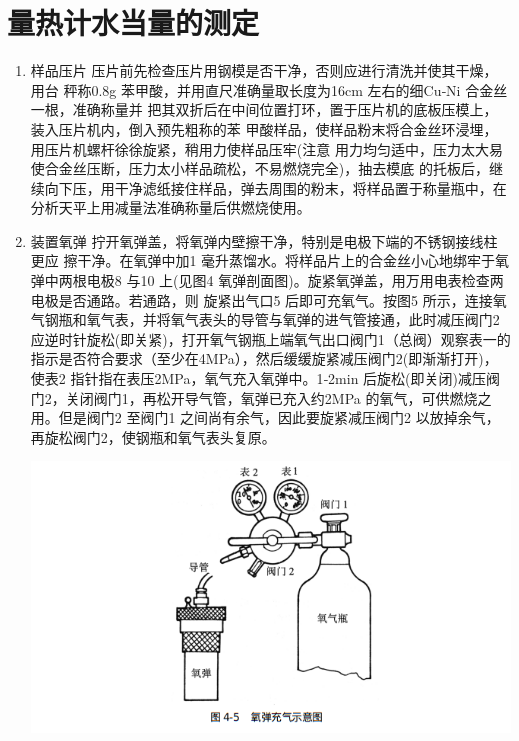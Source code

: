 \documentclass[11pt]{report}
\begin{document}
\section{量热计水当量的测定}
\label{sec:orgd83a7b9}
\begin{enumerate}
\item 样品压片
\label{sec:org9ac580b}
     压片前先检查压片用钢模是否干净，否则应进行清洗并使其干燥，用台
秤称0.8g 苯甲酸，并用直尺准确量取长度为16cm 左右的细Cu‐Ni 合金丝一根，准确称量并
把其双折后在中间位置打环，置于压片机的底板压模上，装入压片机内，倒入预先粗称的苯
甲酸样品，使样品粉末将合金丝环浸埋，用压片机螺杆徐徐旋紧，稍用力使样品压牢(注意
用力均匀适中，压力太大易使合金丝压断，压力太小样品疏松，不易燃烧完全)，抽去模底
的托板后，继续向下压，用干净滤纸接住样品，弹去周围的粉末，将样品置于称量瓶中，在
分析天平上用减量法准确称量后供燃烧使用。　
\item 装置氧弹
\label{sec:org5af48a4}
     拧开氧弹盖，将氧弹内壁擦干净，特别是电极下端的不锈钢接线柱更应
擦干净。在氧弹中加1 毫升蒸馏水。将样品片上的合金丝小心地绑牢于氧弹中两根电极8
与10 上(见图4 氧弹剖面图)。旋紧氧弹盖，用万用电表检查两电极是否通路。若通路，则
旋紧出气口5 后即可充氧气。按图5 所示，连接氧气钢瓶和氧气表，并将氧气表头的导管与氧弹的进气管接通，此时减压阀门2 应逆时针旋松(即关紧)，打开氧气钢瓶上端氧气出口阀门1（总阀）观察表一的指示是否符合要求（至少在4MPa），然后缓缓旋紧减压阀门2(即渐渐打开)，使表2 指针指在表压2MPa，氧气充入氧弹中。1‐2min 后旋松(即关闭)减压阀门2，关闭阀门1，再松开导气管，氧弹已充入约2MPa 的氧气，可供燃烧之用。但是阀门2 至阀门1 之间尚有余气，因此要旋紧减压阀门2 以放掉余气，再旋松阀门2，使钢瓶和氧气表头复原。

\begin{center}
\includegraphics[width=.9\linewidth]{../img/3.png}
\end{center}
\end{enumerate}
\end{document}
